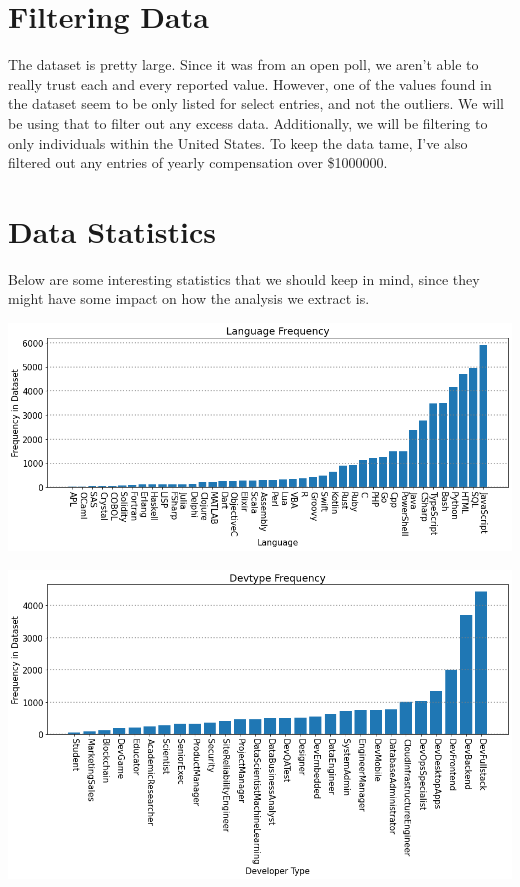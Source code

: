 \documentclass{report}
\begin{document}
\section{Filtering Data}

The dataset is pretty large. Since it was from an open poll, we aren't able to really trust each and every reported value. However, one of the values found in the dataset seem to be only listed for select entries, and not the outliers. We will be using that to filter out any excess data. Additionally, we will be filtering to only individuals within the United States. To keep the data tame, I've also filtered out any entries of yearly compensation over \$1000000.

\section{Data Statistics}

Below are some interesting statistics that we should keep in mind, since they might have some impact on how the analysis we extract is.

\vspace{0.5in}

\includegraphics[width=0.9\linewidth]{frequencyLanguage.png}

\vspace{0.5in}

\includegraphics[width=0.9\linewidth]{frequencyDevtype.png}
\end{document}
